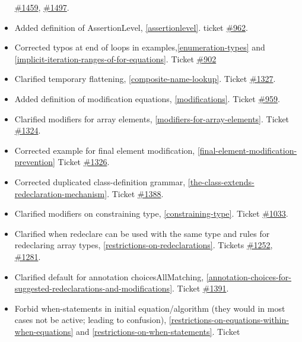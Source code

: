 \begin{itemize}
  \href{https://trac.modelica.org/Modelica/ticket/1459}{\#1459},
  \href{https://trac.modelica.org/Modelica/ticket/1497}{\#1497}.
\item
  Added definition of AssertionLevel, \autoref{assertionlevel}. ticket
  \href{https://trac.modelica.org/Modelica/ticket/962}{\#962}.
\item
  Corrected typos at end of loops in examples,\autoref{enumeration-types} and
  \autoref{implicit-iteration-ranges-of-for-equations}. Ticket
  \href{https://trac.modelica.org/Modelica/ticket/902}{\#902}
\item
  Clarified temporary flattening, \autoref{composite-name-lookup}. Ticket
  \href{https://trac.modelica.org/Modelica/ticket/1327}{\#1327}.
\item
  Added definition of modification equations, \autoref{modifications}. Ticket
  \href{https://trac.modelica.org/Modelica/ticket/959}{\#959}.
\item
  Clarified modifiers for array elements, \autoref{modifiers-for-array-elements}. Ticket
  \href{https://trac.modelica.org/Modelica/ticket/1324}{\#1324}.
\item
  Corrected example for final element modification, \autoref{final-element-modification-prevention}
  Ticket \href{https://trac.modelica.org/Modelica/ticket/1326}{\#1326}.
\item
  Corrected duplicated class-definition grammar, \autoref{the-class-extends-redeclaration-mechanism}. Ticket
  \href{https://trac.modelica.org/Modelica/ticket/1388}{\#1388}.
\item
  Clarified modifiers on constraining type, \autoref{constraining-type}. Ticket
  \href{https://trac.modelica.org/Modelica/ticket/1033}{\#1033}.
\item
  Clarified when redeclare can be used with the same type and rules for
  redeclaring array types, \autoref{restrictions-on-redeclarations}. Tickets
  \href{https://trac.modelica.org/Modelica/ticket/1252}{\#1252},
  \href{https://trac.modelica.org/Modelica/ticket/1281}{\#1281}.
\item
  Clarified default for annotation choicesAllMatching, \autoref{annotation-choices-for-suggested-redeclarations-and-modifications}.
  Ticket \href{https://trac.modelica.org/Modelica/ticket/1391}{\#1391}.
\item
  Forbid when-statements in initial equation/algorithm (they would in
  most cases not be active; leading to confusion), \autoref{restrictions-on-equations-within-when-equations} and
  \autoref{restrictions-on-when-statements}. Ticket

\end{itemize}
